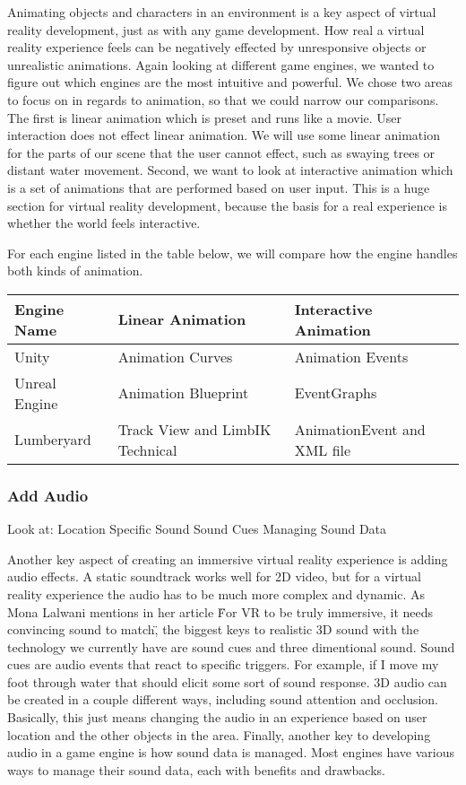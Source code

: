 \documentclass[10pt,journal,compsoc,onecolumn, draftclsnofoot]{IEEEtran}
\begin{document}
Animating objects and characters in an environment is a key aspect of virtual reality development, just as with any game development.
How real a virtual reality experience feels can be negatively effected by unresponsive objects or unrealistic animations.
Again looking at different game engines, we wanted to figure out which engines are the most intuitive and powerful.
We chose two areas to focus on in regards to animation, so that we could narrow our comparisons.
The first is linear animation which is preset and runs like a movie. User interaction does not effect linear animation.
We will use some linear animation for the parts of our scene that the user cannot effect, such as swaying trees or distant water movement.
Second, we want to look at interactive animation which is a set of animations that are performed based on user input.
This is a huge section for virtual reality development, because the basis for a real experience is whether the world feels interactive.

For each engine listed in the table below, we will compare how the engine handles both kinds of animation.

\vspace{2mm}
\begin{table}[h!]
\centering
  \begin{tabu} to 1.0\textwidth { | X[l] || X[c] | X[c] |  }
  \hline
  Engine Name & Linear Animation & Interactive Animation\\
  \hline
  Unity  & Animation Curves & Animation Events\\
  Unreal Engine & Animation Blueprint & EventGraphs\\
  Lumberyard & Track View and LimbIK Technical & AnimationEvent and XML file\\
  \hline
  \end{tabu}
\end{table}
\vspace{2mm}

\subsubsection{Add Audio}
Look at:
Location Specific Sound
Sound Cues
Managing Sound Data

Another key aspect of creating an immersive virtual reality experience is adding audio effects.
A static soundtrack works well for 2D video, but for a virtual reality experience the audio has to be much more complex and dynamic.
As Mona Lalwani mentions in her article \"For VR to be truly immersive, it needs convincing sound to match\", the biggest keys to realistic 3D sound with the technology we currently have are sound cues and three dimentional sound.
Sound cues are audio events that react to specific triggers.  For example, if I move my foot through water that should elicit some sort of sound response.
3D audio can be created in a couple different ways, including sound attention and occlusion.
Basically, this just means changing the audio in an experience based on user location and the other objects in the area.
Finally, another key to developing audio in a game engine is how sound data is managed.  Most engines have various ways to manage their sound data, each with benefits and drawbacks.
\end{document}
